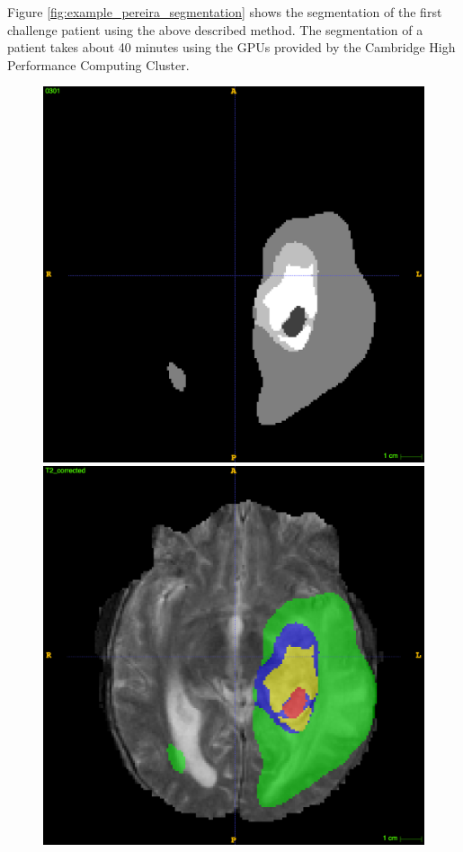 \documentclass[12pt,a4paper,twoside,openright]{report}
\begin{document}
Figure \ref{fig:example_pereira_segmentation} shows the segmentation of the first challenge patient using the above described method. The segmentation of a patient takes about 40 minutes using the GPUs provided by the Cambridge High Performance Computing Cluster.
\begin{figure}[h]
	\centering
	\includegraphics[scale = 0.1]{challenge_1_segmentation_66}
	\includegraphics[scale = 0.1]{challenge_1_segmentation_with_T2_66}

\end{figure}
\end{document}
